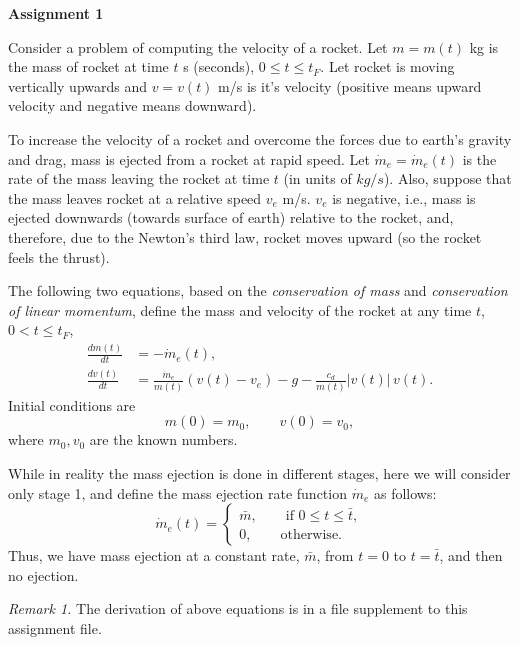 \documentclass[12pt,a4paper]{report}
\begin{document}
\begin{center} 
\textbf{Assignment 1} 
\end{center}

Consider a problem of computing the velocity of a rocket. Let $m = m(t)$ kg is the mass of rocket at time $t$ s (seconds), $0\leq t \leq t_F$. Let rocket is moving vertically upwards and $v = v(t)$ m/s is it's velocity (positive means upward velocity and negative means downward). 

To increase the velocity of a rocket and overcome the forces due to earth's gravity and drag, mass is ejected from a rocket at rapid speed. Let $\dot{m}_e = \dot{m}_e(t)$ is the rate of the mass leaving the rocket at time $t$ (in units of $kg/s$). Also, suppose that the mass leaves rocket at a relative speed $v_e$ m/s. $v_e$ is negative, i.e., mass is ejected downwards (towards surface of earth) relative to the rocket, and, therefore, due to the Newton's third law, rocket moves upward (so the rocket feels the thrust).

The following two equations, based on the \emph{conservation of mass} and \emph{conservation of linear momentum}, define the mass and velocity of the rocket at any time $t$, $0< t \leq t_F$,
\begin{align}
\frac{d m(t)}{d t} &= - \dot{m}_e(t), \label{eq:ode1} \\
\frac{d v(t)}{d t} &= \frac{\dot{m}_e}{m(t)} (v(t) - v_e) - g - \frac{c_d}{m(t)} |v(t)| \, v(t) \label{eq:ode2}.
\end{align}
Initial conditions are
\begin{equation}
m(0) = m_0, \qquad v(0) = v_0,
\end{equation}
where $m_0, v_0$ are the known numbers. 

While in reality the mass ejection is done in different stages, here we will consider only stage 1, and define the mass ejection rate function $\dot{m}_e$ as follows:
\begin{equation}\label{eq:me}
\dot{m}_e(t) = \begin{cases}
\bar{m}, \qquad \text{if } 0 \leq t \leq \bar{t}, \\
0, \qquad \text{otherwise} .
\end{cases}
\end{equation}
Thus, we have mass ejection at a constant rate, $\bar{m}$, from $t=0$ to $t=\bar{t}$, and then no ejection.

\textit{Remark 1.} The derivation of above equations is in a file supplement to this assignment file. 
\end{document}
